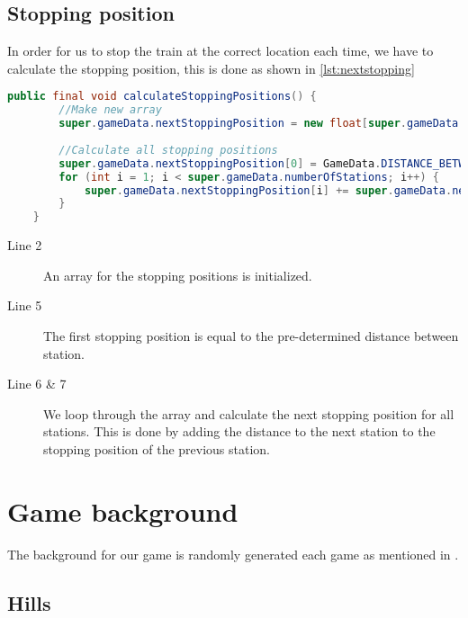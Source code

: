 \subsection{Stopping position}

In order for us to stop the train at the correct location each time, we have to calculate the stopping position, this is done as shown in \autoref{lst:nextstopping}

\begin{lstlisting}[language=java,firstnumber=1,caption={Smoke clouds getting reset based on time intervals},label=lst:stations]
    public final void calculateStoppingPositions() {        
        //Make new array
        super.gameData.nextStoppingPosition = new float[super.gameData.numberOfStations + 1];
        
        //Calculate all stopping positions
        super.gameData.nextStoppingPosition[0] = GameData.DISTANCE_BETWEEN_STATIONS;
        for (int i = 1; i < super.gameData.numberOfStations; i++) {
            super.gameData.nextStoppingPosition[i] += super.gameData.nextStoppingPosition[i-1] + GameData.DISTANCE_BETWEEN_STATIONS;
        }
    }
\end{lstlisting}

\begin{description}
\item[Line 2] An array for the stopping positions is initialized. 
\item[Line 5] The first stopping position is equal to the pre-determined distance between station. 
\item[Line 6 \& 7] We loop through the array and calculate the next stopping position for all stations. This is done by adding the distance to the next station to the stopping position of the previous station.
\end{description}

\section{Game background}

The background for our game is randomly generated each game as mentioned in . 

\subsection{Hills}


